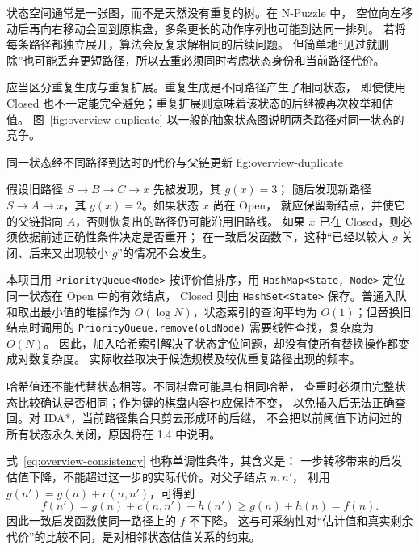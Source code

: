 状态空间通常是一张图，而不是天然没有重复的树。在 N-Puzzle 中，
空位向左移动后再向右移动会回到原棋盘，多条更长的动作序列也可能到达同一排列。
若将每条路径都独立展开，算法会反复求解相同的后续问题。
但简单地“见过就删除”也可能丢弃更短路径，所以去重必须同时考虑状态身份和当前路径代价。


应当区分重复生成与重复扩展。重复生成是不同路径产生了相同状态，
即使使用 Closed 也不一定能完全避免；重复扩展则意味着该状态的后继被再次枚举和估值。
图~\ref{fig:overview-duplicate} 以一般的抽象状态图说明两条路径对同一状态的竞争。

  {同一状态经不同路径到达时的代价与父链更新}
  {fig:overview-duplicate}

假设旧路径 $S\to B\to C\to x$ 先被发现，其 $g(x)=3$；
随后发现新路径 $S\to A\to x$，其 $g(x)=2$。如果状态 $x$ 尚在 Open，
就应保留新结点，并使它的父链指向 $A$，否则恢复出的路径仍可能沿用旧路线。
如果 $x$ 已在 Closed，则必须依据前述正确性条件决定是否重开；
在一致启发函数下，这种“已经以较大 $g$ 关闭、后来又出现较小 $g$”的情况不会发生。

本项目用 \texttt{PriorityQueue<Node>} 按评价值排序，用
\texttt{HashMap<State, Node>} 定位同一状态在 Open 中的有效结点，
Closed 则由 \texttt{HashSet<State>} 保存。普通入队和取出最小值的堆操作为
$O(\log N)$，状态索引的查询平均为 $O(1)$；但替换旧结点时调用的
\texttt{PriorityQueue.remove(oldNode)} 需要线性查找，复杂度为 $O(N)$。
因此，加入哈希索引解决了状态定位问题，却没有使所有替换操作都变成对数复杂度。
实际收益取决于候选规模及较优重复路径出现的频率。

哈希值还不能代替状态相等。不同棋盘可能具有相同哈希，
查重时必须由完整状态比较确认是否相同；作为键的棋盘内容也应保持不变，
以免插入后无法正确查回。对 IDA*，当前路径集合只剪去形成环的后继，
不会把以前阈值下访问过的所有状态永久关闭，原因将在 1.4 中说明。
\FloatBarrier


式~\eqref{eq:overview-consistency} 也称单调性条件，其含义是：
一步转移带来的启发估值下降，不能超过这一步的实际代价。对父子结点 $n,n'$，
利用 $g(n')=g(n)+c(n,n')$，可得到
\begin{equation}
  f(n')=g(n)+c(n,n')+h(n')
  \geq g(n)+h(n)=f(n).
  \label{eq:overview-monotone}
\end{equation}
因此一致启发函数使同一路径上的 $f$ 不下降。
这与可采纳性对“估计值和真实剩余代价”的比较不同，是对相邻状态估值关系的约束。


